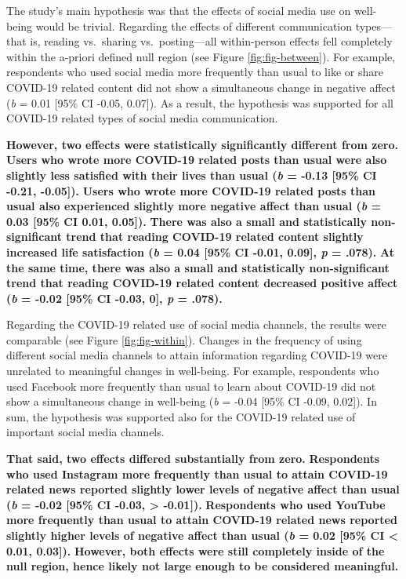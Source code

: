 \documentclass[
  man,mask]{apa7}
\begin{document}
The study's main hypothesis was that the effects of social media use on well-being would be trivial.
Regarding the effects of different communication types---that is, reading vs.~sharing vs.~posting---all within-person effects fell completely within the a-priori defined null region (see Figure \ref{fig:fig-between}).
For example, respondents who used social media more frequently than usual to like or share COVID-19 related content did not show a simultaneous change in negative affect (\emph{b} = 0.01 {[}95\% CI -0.05, 0.07{]}).
As a result, the hypothesis was supported for all COVID-19 related types of social media communication.

\textbf{However, two effects were statistically significantly different from zero.}
\textbf{Users who wrote more COVID-19 related posts than usual were also slightly less satisfied with their lives than usual (\emph{b} = -0.13 {[}95\% CI -0.21, -0.05{]}).}
\textbf{Users who wrote more COVID-19 related posts than usual also experienced slightly more negative affect than usual (\emph{b} = 0.03 {[}95\% CI 0.01, 0.05{]}).}
\textbf{There was also a small and statistically non-significant trend that reading COVID-19 related content slightly increased life satisfaction (\emph{b} = 0.04 {[}95\% CI -0.01, 0.09{]}, \emph{p} = .078).}
\textbf{At the same time, there was also a small and statistically non-significant trend that reading COVID-19 related content decreased positive affect (\emph{b} = -0.02 {[}95\% CI -0.03, 0{]}, \emph{p} = .078).}

Regarding the COVID-19 related use of social media channels, the results were comparable (see Figure \ref{fig:fig-within}).
Changes in the frequency of using different social media channels to attain information regarding COVID-19 were unrelated to meaningful changes in well-being.
For example, respondents who used Facebook more frequently than usual to learn about COVID-19 did not show a simultaneous change in well-being (\emph{b} = -0.04 {[}95\% CI -0.09, 0.02{]}).
In sum, the hypothesis was supported also for the COVID-19 related use of important social media channels.

\textbf{That said, two effects differed substantially from zero.}
\textbf{Respondents who used Instagram more frequently than usual to attain COVID-19 related news reported slightly lower levels of negative affect than usual (\emph{b} = -0.02 {[}95\% CI -0.03, \textgreater{} -0.01{]}).}
\textbf{Respondents who used YouTube more frequently than usual to attain COVID-19 related news reported slightly higher levels of negative affect than usual (\emph{b} = 0.02 {[}95\% CI \textless{} 0.01, 0.03{]}).}
\textbf{However, both effects were still completely inside of the null region, hence likely not large enough to be considered meaningful.}
\end{document}
